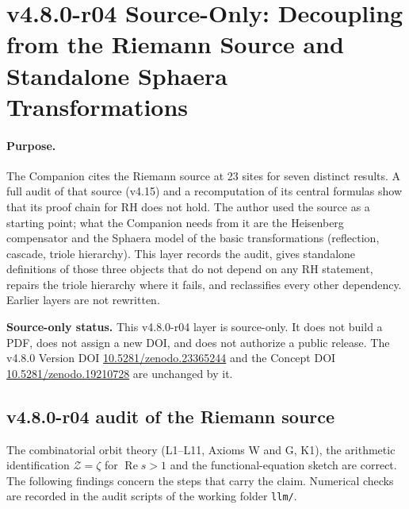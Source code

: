 
\clearpage
\section*{v4.8.0-r04 Source-Only: Decoupling from the Riemann Source and Standalone Sphaera Transformations}
\label{sec:v480-r04-riemann-decoupling}

\paragraph{Purpose.}
The Companion cites the Riemann source \cite{brendecke2026rh} at 23 sites for seven distinct
results.  A full audit of that source (v4.15) and a recomputation of its central formulas
show that its proof chain for RH does not hold.  The author used the source as a starting
point; what the Companion needs from it are the Heisenberg compensator and the Sphaera model
of the basic transformations (reflection, cascade, triole hierarchy).  This layer records the
audit, gives standalone definitions of those three objects that do not depend on any RH
statement, repairs the triole hierarchy where it fails, and reclassifies every other
dependency.  Earlier layers are not rewritten.

\noindent\textbf{Source-only status.}
This v4.8.0-r04 layer is source-only.  It does not build a PDF, does not assign a new DOI,
and does not authorize a public release.  The v4.8.0 Version DOI
\href{https://doi.org/10.5281/zenodo.23365244}{10.5281/zenodo.23365244} and the Concept DOI
\href{https://doi.org/10.5281/zenodo.19210728}{10.5281/zenodo.19210728} are unchanged by it.

\subsection*{v4.8.0-r04 audit of the Riemann source}
\label{subsec:v480-r04-source-audit}

The combinatorial orbit theory (L1--L11, Axioms W and G, K1), the arithmetic identification
\(\mathcal Z=\zeta\) for \(\operatorname{Re}s>1\) and the functional-equation sketch are correct.
The following findings concern the steps that carry the claim.  Numerical checks are recorded
in the audit scripts of the working folder \texttt{llm/}.

